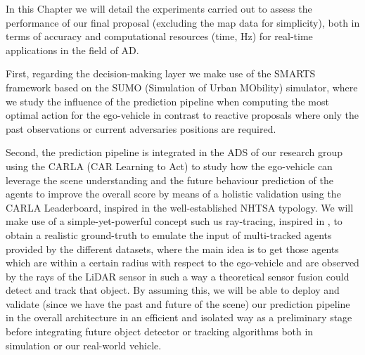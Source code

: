 In this Chapter we will detail the experiments carried out to assess the performance of our final proposal (excluding the map data for simplicity), both in terms of accuracy and computational resources (time, Hz) for real-time applications in the field of \ac{AD}. %


First, regarding the decision-making layer we make use of the SMARTS \cite{SMARTS} framework based on the SUMO (Simulation of Urban MObility) \cite{Sumo} simulator, where we study the influence of the prediction pipeline when computing the most optimal action for the ego-vehicle in contrast to reactive proposals where only the past observations or current adversaries positions are required. 

Second, the prediction pipeline is integrated in the \ac{ADS} of our research group using the CARLA \cite{dosovitskiy2017carla} (CAR Learning to Act) to study how the ego-vehicle can leverage the scene understanding and the future behaviour prediction of the agents to improve the overall score by means of a holistic validation using the CARLA Leaderboard, inspired in the well-established NHTSA typology. We will make use of a simple-yet-powerful concept such us ray-tracing, inspired in \cite{de2022ad}, to obtain a realistic ground-truth to emulate the input of multi-tracked agents provided by the different datasets, where the main idea is to get those agents which are within a certain radius with respect to the ego-vehicle and are observed by the rays of the LiDAR sensor in such a way a theoretical sensor fusion could detect and track that object. By assuming this, we will be able to deploy and validate (since we have the past and future of the scene) our prediction pipeline in the overall architecture in an efficient and isolated way as a preliminary stage before integrating future object detector or tracking algorithms both in simulation or our real-world vehicle.

